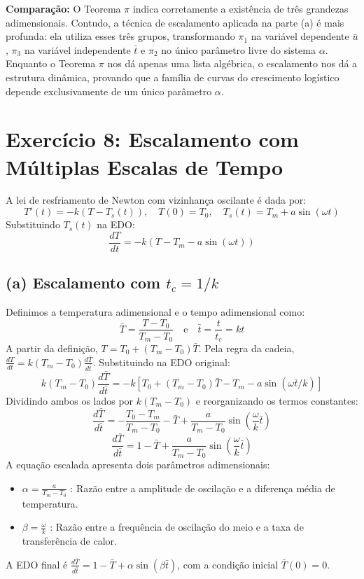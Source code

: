 \documentclass{article}
\begin{document}
\textbf{Comparação:} O Teorema $\pi$ indica corretamente a existência de três grandezas adimensionais. Contudo, a técnica de escalamento aplicada na parte (a) é mais profunda: ela utiliza esses três grupos, transformando $\pi_1$ na variável dependente $\bar{u}$, $\pi_3$ na variável independente $\bar{t}$ e $\pi_2$ no único parâmetro livre do sistema $\alpha$. Enquanto o Teorema $\pi$ nos dá apenas uma lista algébrica, o escalamento nos dá a estrutura dinâmica, provando que a família de curvas do crescimento logístico depende exclusivamente de um único parâmetro $\alpha$.

\section*{Exercício 8: Escalamento com Múltiplas Escalas de Tempo}

A lei de resfriamento de Newton com vizinhança oscilante é dada por:
\[ T'(t) = -k(T - T_s(t)), \quad T(0) = T_0, \quad T_s(t) = T_m + a \sin(\omega t) \]
Substituindo $T_s(t)$ na EDO:
\[ \frac{dT}{dt} = -k(T - T_m - a \sin(\omega t)) \]

\subsection*{(a) Escalamento com $t_c = 1/k$}
Definimos a temperatura adimensional e o tempo adimensional como:
\[ \bar{T} = \frac{T - T_0}{T_m - T_0} \quad \text{e} \quad \bar{t} = \frac{t}{t_c} = kt \]
A partir da definição, $T = T_0 + (T_m - T_0)\bar{T}$. Pela regra da cadeia, $\frac{dT}{dt} = k(T_m - T_0)\frac{d\bar{T}}{d\bar{t}}$.
Substituindo na EDO original:
\[ k(T_m - T_0)\frac{d\bar{T}}{d\bar{t}} = -k [T_0 + (T_m - T_0)\bar{T} - T_m - a \sin(\omega \bar{t}/k)] \]
Dividindo ambos os lados por $k(T_m - T_0)$ e reorganizando os termos constantes:
\[ \frac{d\bar{T}}{d\bar{t}} = -\frac{T_0 - T_m}{T_m - T_0} - \bar{T} + \frac{a}{T_m - T_0}\sin\left(\frac{\omega}{k}\bar{t}\right) \]
\[ \frac{d\bar{T}}{d\bar{t}} = 1 - \bar{T} + \frac{a}{T_m - T_0}\sin\left(\frac{\omega}{k}\bar{t}\right) \]
A equação escalada apresenta dois parâmetros adimensionais:
\begin{itemize}
    \item $\alpha = \frac{a}{T_m - T_0}$ : Razão entre a amplitude de oscilação e a diferença média de temperatura.
    \item $\beta = \frac{\omega}{k}$ : Razão entre a frequência de oscilação do meio e a taxa de transferência de calor.
\end{itemize}
A EDO final é $\frac{d\bar{T}}{d\bar{t}} = 1 - \bar{T} + \alpha \sin(\beta \bar{t})$, com a condição inicial $\bar{T}(0) = 0$.
\end{document}
